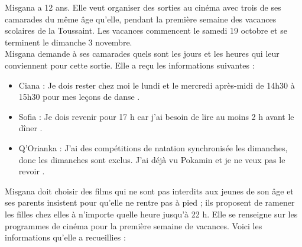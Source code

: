 Misgana a 12 ans. Elle veut organiser des sorties au cinéma avec trois de ses camarades du même âge qu'elle, pendant la première semaine des vacances scolaires de la Toussaint. Les vacances commencent le samedi 19 octobre et se terminent le dimanche 3 novembre. \\
Misgana demande à ses camarades quels sont les jours et les heures qui leur conviennent pour cette sortie. Elle a reçu les informations suivantes :
\begin{itemize}
   \item Ciana : \og Je dois rester chez moi le lundi et le mercredi après-midi de 14h30 à 15h30 pour mes leçons de danse \fg.
   \item Sofia : \og Je dois revenir pour 17 h car j'ai besoin de lire au moins 2 h avant le dîner \fg.
   \item Q'Orianka : \og J'ai des compétitions de natation synchronisée les dimanches, donc les dimanches sont exclus. J'ai déjà vu Pokamin et je ne veux pas le revoir \fg.
\end{itemize}
Misgana doit choisir des films qui ne sont pas interdits aux jeunes de son âge et ses parents insistent pour qu'elle ne rentre pas à pied ; ils proposent de ramener les filles chez elles à n'importe quelle heure jusqu'à 22 h. Elle se renseigne sur les programmes de cinéma pour la première semaine de vacances. Voici les informations qu'elle a recueillies :
